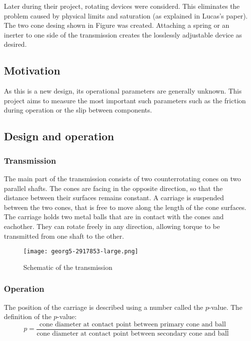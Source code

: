 \documentclass[12pt]{article}
\begin{document}
Later during their project, rotating devices were considerd. This eliminates the problem caused by physical limits and saturation (as explained in Lucas's paper). The two cone desing shown in Figure \todo was created. Attaching a spring or an inerter to one side of the transmission creates the losslessly adjustable device as desired. 





\subsection{Motivation}
As this is a new design, its operational parameters are generally unknown. This project aims to measure the most important such parameters such as the friction during operation or the slip between components.


\subsection{Design and operation}

\subsubsection{Transmission}
The main part of the transmission consists of two counterrotating cones on two parallel shafts. The cones are facing in the opposite direction, so that the distance between their surfaces remains constant. A carriage is suspended between the two cones, that is free to move along the length of the cone surfaces. The carriage holds two metal balls that are in contact with the cones and eachother. They can rotate freely in any direction, allowing torque to be transmitted from one shaft to the other.

\begin{figure}[h]
    \centering
    \texttt{[image: georg5-2917853-large.png]}
    \caption{Schematic of the transmission}
    \label{fig:transmissionSchematic}
\end{figure}

\subsubsection{Operation}
The position of the carriage is described using a number called the $p$-value. The definition of the $p$-value:
$$p=\frac{\text{cone diameter at contact point between primary cone and ball}}{\text{cone diameter at contact point between secondary cone and ball}}$$ 
\end{document}
